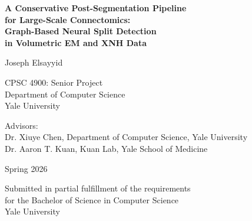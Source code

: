 \begin{titlepage}
\centering
\vspace*{2cm}

{\Huge\bfseries A Conservative Post-Segmentation Pipeline\\[0.4em]
for Large-Scale Connectomics:\\[0.4em]
Graph-Based Neural Split Detection\\[0.4em]
in Volumetric EM and XNH Data\par}

\vspace{2.5cm}

{\LARGE Joseph Elsayyid\par}

\vspace{1.5cm}

{\large CPSC 4900: Senior Project\\
Department of Computer Science\\
Yale University\par}

\vspace{1.2cm}

{\large Advisors:\\[0.3em]
Dr. Xiuye Chen, Department of Computer Science, Yale University\\
Dr. Aaron T. Kuan, Kuan Lab, Yale School of Medicine\par}

\vspace{1.2cm}

{\large Spring 2026\par}

\vfill

{\small
Submitted in partial fulfillment of the requirements\\
for the Bachelor of Science in Computer Science\\
Yale University
}

\end{titlepage}

